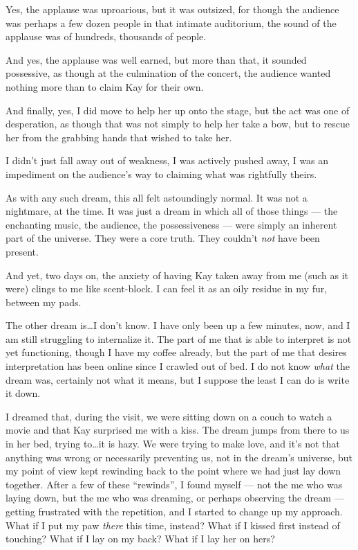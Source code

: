 Yes, the applause was uproarious, but it was outsized, for though the audience was perhaps a few dozen people in that intimate auditorium, the sound of the applause was of hundreds, thousands of people.

And yes, the applause was well earned, but more than that, it sounded possessive, as though at the culmination of the concert, the audience wanted nothing more than to claim Kay for their own.

And finally, yes, I did move to help her up onto the stage, but the act was one of desperation, as though that was not simply to help her take a bow, but to rescue her from the grabbing hands that wished to take her.

I didn't just fall away out of weakness, I was actively pushed away, I was an impediment on the audience's way to claiming what was rightfully theirs.

As with any such dream, this all felt astoundingly normal. It was not a nightmare, at the time. It was just a dream in which all of those things --- the enchanting music, the audience, the possessiveness --- were simply an inherent part of the universe. They were a core truth. They couldn't \emph{not} have been present.

And yet, two days on, the anxiety of having Kay taken away from me (such as it were) clings to me like scent-block. I can feel it as an oily residue in my fur, between my pads.

The other dream is\ldots I don't know. I have only been up a few minutes, now, and I am still struggling to internalize it. The part of me that is able to interpret is not yet functioning, though I have my coffee already, but the part of me that desires interpretation has been online since I crawled out of bed. I do not know \emph{what} the dream was, certainly not what it means, but I suppose the least I can do is write it down.

I dreamed that, during the visit, we were sitting down on a couch to watch a movie and that Kay surprised me with a kiss. The dream jumps from there to us in her bed, trying to\ldots it is hazy. We were trying to make love, and it's not that anything was wrong or necessarily preventing us, not in the dream's universe, but my point of view kept rewinding back to the point where we had just lay down together. After a few of these ``rewinds'', I found myself --- not the me who was laying down, but the me who was dreaming, or perhaps observing the dream --- getting frustrated with the repetition, and I started to change up my approach. What if I put my paw \emph{there} this time, instead? What if I kissed first instead of touching? What if I lay on my back? What if I lay her on hers?

